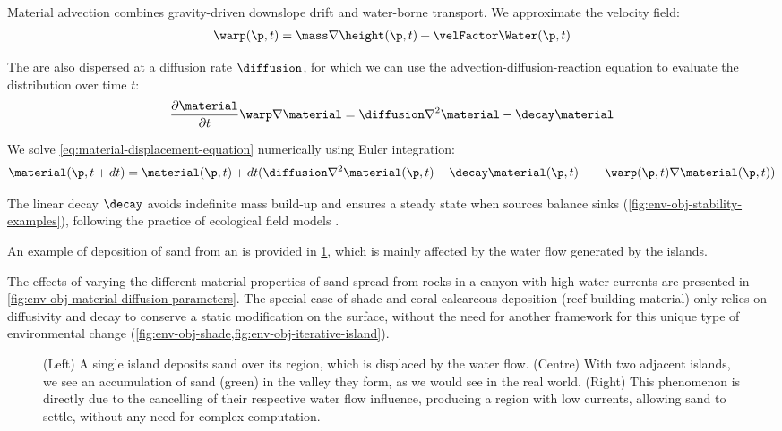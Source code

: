 Material advection combines gravity-driven downslope drift and water-borne transport. We approximate the velocity field:
\begin{align}
\warp(\p, t) = \mass \nabla \height(\p, t) + \velFactor \Water(\p, t)
\end{align}

The  are also dispersed at a diffusion rate $\diffusion$, for which we can use the advection-diffusion-reaction equation to evaluate the distribution over time $t$:
\begin{align}
\label{eq:material-displacement-equation}
\frac{\partial \material}{\partial t} \warp \nabla \material = \diffusion \nabla^2 \material - \decay \material
\end{align}

We solve \eqref{eq:material-displacement-equation} numerically using Euler integration:
\begin{align}
\material(\p, t + dt) &= \material(\p, t) + dt ( \diffusion \nabla^2 \material(\p, t) - \decay \material(\p, t) \ & - \warp(\p, t) \nabla \material(\p, t) ) \nonumber
\end{align}

The linear decay $\decay$ avoids indefinite mass build-up and ensures a steady state when sources balance sinks (\cref{fig:env-obj-stability-examples}), following the practice of ecological field models \cite{Seidl2012}.

An example of deposition of sand from an  is provided in \cref{fig:env-obj-double-island-sand-deposition}, which is mainly affected by the water flow generated by the islands.

The effects of varying the different material properties of sand spread from rocks in a canyon with high water currents are presented in \cref{fig:env-obj-material-diffusion-parameters}. The special case of shade and coral calcareous deposition (reef-building material) only relies on diffusivity and decay to conserve a static modification on the surface, without the need for another framework for this unique type of environmental change (\cref{fig:env-obj-shade,fig:env-obj-iterative-island}).

\begin{figure}
\caption{(Left) A single island deposits sand over its region, which is displaced by the water flow. (Centre) With two adjacent islands, we see an accumulation of sand (green) in the valley they form, as we would see in the real world. (Right) This phenomenon is directly due to the cancelling of their respective water flow influence, producing a region with low currents, allowing sand to settle, without any need for complex computation.}
\label{fig:env-obj-double-island-sand-deposition}
\end{figure}


